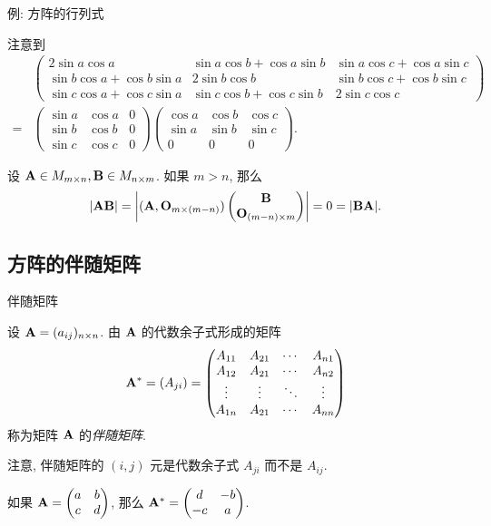\begin{frame}{例: 方阵的行列式}
	\onslide<+->
	\begin{answer}
		注意到
		\begin{align*}
			&\begin{pmatrix}
			2\sin a\cos a&\sin a\cos b+\cos a\sin b&\sin a\cos c+\cos a\sin c\\
			\sin b\cos a+\cos b\sin a&2\sin b\cos b&\sin b\cos c+\cos b\sin c\\
			\sin c\cos a+\cos c\sin a&\sin c\cos b+\cos c\sin b&2\sin c\cos c
		\end{pmatrix}\\=&\begin{pmatrix}
			\sin a&\cos a&0\\
			\sin b&\cos b&0\\
			\sin c&\cos c&0
		\end{pmatrix}\begin{pmatrix}
			\cos a&\cos b&\cos c\\
			\sin a&\sin b&\sin c\\
			0&0&0
		\end{pmatrix}.
	\end{align*}
	\end{answer}
	\onslide<+->
	设 ${\mathbf{A}}\in M_{m\times n},{\mathbf{B}}\in M_{n\times m}$.
	\onslide<+->
	如果 $m>n$, 那么
	\[|{\mathbf{A}}{\mathbf{B}}|=\left|\begin{matrix}({\mathbf{A}},{\mathbf{O}}_{m\times(m-n)})\begin{pmatrix}
		{\mathbf{B}}\\{\mathbf{O}}_{(m-n)\times m}
	\end{pmatrix}\end{matrix}\right|=0=|{\mathbf{B}}{\mathbf{A}}|.\]
\end{frame}


\subsection{方阵的伴随矩阵}

\begin{frame}{伴随矩阵}
	\onslide<+->
	\begin{definition}
		设 ${\mathbf{A}}=(a_{ij})_{n\times n}$.
		由 ${\mathbf{A}}$ 的代数余子式形成的矩阵
		\[{\mathbf{A}}^*=(A_{ji})=\begin{pmatrix}
			A_{11}&A_{21}&\cdots&A_{n1}\\
			A_{12}&A_{21}&\cdots&A_{n2}\\
			\vdots&\vdots&\ddots&\vdots\\
			A_{1n}&A_{21}&\cdots&A_{nn}
		\end{pmatrix}\]
		称为矩阵 ${\mathbf{A}}$ 的\emph{伴随矩阵}.
	\end{definition}
	\onslide<+->
	注意, 伴随矩阵的 $(i,j)$ 元是代数余子式 \alert{$A_{ji}$ 而不是 $A_{ij}$}.
	\onslide<+->
	\begin{example}
		如果 ${\mathbf{A}}=\begin{pmatrix}
			a&b\\c&d
		\end{pmatrix}$, 那么 ${\mathbf{A}}^*=\begin{pmatrix}
			d&-b\\-c&a
		\end{pmatrix}$.
	\end{example}
\end{frame}


